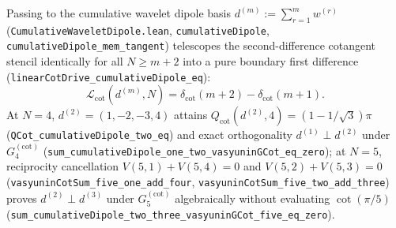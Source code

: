\documentclass[11pt,a4paper]{article}
\theoremstyle{definition}
\begin{document}
Passing to the cumulative wavelet dipole basis $d^{(m)} := \sum_{r=1}^m w^{(r)}$ (\texttt{Cumulative\allowbreak Wavelet\allowbreak Dipole.lean}, \texttt{cumulative\allowbreak Dipole}, \texttt{cumulative\allowbreak Dipole\_\allowbreak mem\_\allowbreak tangent}) telescopes the second-difference cotangent stencil identically for all $N \ge m + 2$ into a pure boundary first difference (\texttt{linear\allowbreak Cot\allowbreak Drive\_\allowbreak cumulative\allowbreak Dipole\_\allowbreak eq}):
\begin{equation}
\mathcal{L}_{\mathrm{cot}}(d^{(m)}, N) = \delta_{\mathrm{cot}}(m + 2) - \delta_{\mathrm{cot}}(m + 1).
\end{equation}
At $N = 4$, $d^{(2)} = (1, -2, -3, 4)$ attains $Q_{\mathrm{cot}}(d^{(2)}, 4) = (1 - 1/\sqrt{3})\pi$ (\texttt{QCot\_\allowbreak cumulative\allowbreak Dipole\_\allowbreak two\_\allowbreak eq}) and exact orthogonality $d^{(1)} \perp d^{(2)}$ under $G_4^{(\mathrm{cot})}$ (\texttt{sum\_\allowbreak cumulative\allowbreak Dipole\_\allowbreak one\_\allowbreak two\_\allowbreak vasyunin\allowbreak GCot\_\allowbreak eq\_\allowbreak zero}); at $N = 5$, reciprocity cancellation $V(5, 1) + V(5, 4) = 0$ and $V(5, 2) + V(5, 3) = 0$ (\texttt{vasyunin\allowbreak Cot\allowbreak Sum\_\allowbreak five\_\allowbreak one\_\allowbreak add\_\allowbreak four}, \texttt{vasyunin\allowbreak Cot\allowbreak Sum\_\allowbreak five\_\allowbreak two\_\allowbreak add\_\allowbreak three}) proves $d^{(2)} \perp d^{(3)}$ under $G_5^{(\mathrm{cot})}$ algebraically without evaluating $\cot(\pi/5)$ (\texttt{sum\_\allowbreak cumulative\allowbreak Dipole\_\allowbreak two\_\allowbreak three\_\allowbreak vasyunin\allowbreak GCot\_\allowbreak five\_\allowbreak eq\_\allowbreak zero}).
\end{document}
